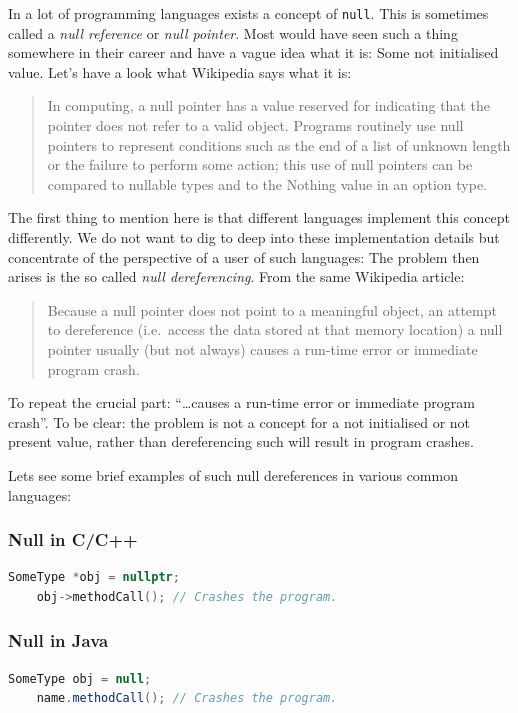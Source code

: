 \documentclass[11pt, a4paper]{report}
\begin{document}
In a lot of programming languages exists a concept of \texttt{null}. This is sometimes called a \textit{null reference} or \textit{null pointer}. Most would have seen such a thing somewhere in their career and have a vague idea what it is: Some not initialised value. Let's have a look what Wikipedia\cite{null-wiki} says what it is:

\begin{quotation}
    In computing, a null pointer has a value reserved for indicating that the pointer does not refer to a valid object. Programs routinely use null pointers to represent conditions such as the end of a list of unknown length or the failure to perform some action; this use of null pointers can be compared to nullable types and to the Nothing value in an option type.
\end{quotation}

The first thing to mention here is that different languages implement this concept differently. We do not want to dig to deep into these implementation details but concentrate of the perspective of a user of such languages: The problem then arises is the so called \textit{null dereferencing}. From the same Wikipedia\cite{null-wiki} article:

\begin{quotation}
    Because a null pointer does not point to a meaningful object, an attempt to dereference (i.e.\ access the data stored at that memory location) a null pointer usually (but not always) causes a run-time error or immediate program crash.
\end{quotation}

To repeat the crucial part: ``\ldots causes a run-time error or immediate program crash''. To be clear: the problem is not a concept for a not initialised or not present value, rather than dereferencing such will result in program crashes.

Lets see some brief examples of such null dereferences in various common languages:

\subsubsection{Null in C/C++}
\begin{lstlisting}[language=C++]
    SomeType *obj = nullptr;
    obj->methodCall(); // Crashes the program.
\end{lstlisting}

\subsubsection{Null in Java}
\begin{lstlisting}[language=Java]
    SomeType obj = null;
    name.methodCall(); // Crashes the program.
\end{lstlisting}
\end{document}
